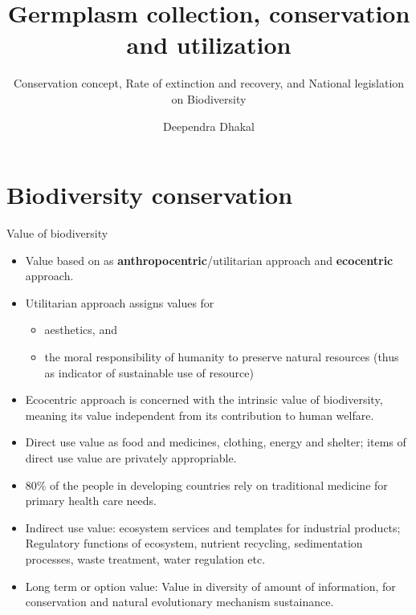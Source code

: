\documentclass[
  ignorenonframetext,
  aspectratio=169]{beamer}
\title{Germplasm collection, conservation and utilization}
\subtitle{Conservation concept, Rate of extinction and recovery, and
National legislation on Biodiversity}
\author{Deependra Dhakal}
\date{}
\institute{Assistant Professor\\
Agriculture and Forestry University\\
\href{mailto:ddhakal.rookie@gmail.com}{\nolinkurl{ddhakal.rookie@gmail.com}}\\
\url{http://rookie.rbind.io/}}
\providecommand{\tightlist}{%
  \setlength{\itemsep}{0pt}\setlength{\parskip}{0pt}}
\begin{document}
\frame{\titlepage}

\begin{frame}[allowframebreaks]
  \tableofcontents[hideallsubsections]
\end{frame}
\hypertarget{biodiversity-conservation}{%
\section{Biodiversity conservation}\label{biodiversity-conservation}}

\begin{frame}{Value of biodiversity}
\protect\hypertarget{value-of-biodiversity}{}
\footnotesize

\begin{itemize}
\tightlist
\item
  Value based on as \textbf{anthropocentric}/utilitarian approach and
  \textbf{ecocentric} approach.
\item
  Utilitarian approach assigns values for

  \begin{itemize}
  \tightlist
  \item
    aesthetics, and
  \item
    the moral responsibility of humanity to preserve natural resources
    (thus as indicator of sustainable use of resource)
  \end{itemize}
\item
  Ecocentric approach is concerned with the intrinsic value of
  biodiversity, meaning its value independent from its contribution to
  human welfare.
\item
  Direct use value as food and medicines, clothing, energy and shelter;
  items of direct use value are privately appropriable.
\item
  80\% of the people in developing countries rely on traditional
  medicine for primary health care needs.
\item
  Indirect use value: ecosystem services and templates for industrial
  products; Regulatory functions of ecosystem, nutrient recycling,
  sedimentation processes, waste treatment, water regulation etc.
\item
  Long term or option value: Value in diversity of amount of
  information, for conservation and natural evolutionary mechanism
  sustainance.
\end{itemize}
\end{frame}
\end{document}
